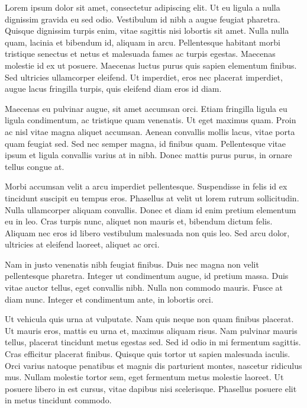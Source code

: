 \documentclass[../main.tex]{subfiles}
\begin{document}
\label{capitolo6}
\thispagestyle{empty}
Lorem ipsum dolor sit amet, consectetur adipiscing elit. Ut eu ligula a nulla dignissim gravida eu sed odio. Vestibulum id nibh a augue feugiat pharetra. Quisque dignissim turpis enim, vitae sagittis nisi lobortis sit amet. Nulla nulla quam, lacinia et bibendum id, aliquam in arcu. Pellentesque habitant morbi tristique senectus et netus et malesuada fames ac turpis egestas. Maecenas molestie id ex ut posuere. Maecenas luctus purus quis sapien elementum finibus. Sed ultricies ullamcorper eleifend. Ut imperdiet, eros nec placerat imperdiet, augue lacus fringilla turpis, quis eleifend diam eros id diam.

Maecenas eu pulvinar augue, sit amet accumsan orci. Etiam fringilla ligula eu ligula condimentum, ac tristique quam venenatis. Ut eget maximus quam. Proin ac nisl vitae magna aliquet accumsan. Aenean convallis mollis lacus, vitae porta quam feugiat sed. Sed nec semper magna, id finibus quam. Pellentesque vitae ipsum et ligula convallis varius at in nibh. Donec mattis purus purus, in ornare tellus congue at.

Morbi accumsan velit a arcu imperdiet pellentesque. Suspendisse in felis id ex tincidunt suscipit eu tempus eros. Phasellus at velit ut lorem rutrum sollicitudin. Nulla ullamcorper aliquam convallis. Donec et diam id enim pretium elementum eu in leo. Cras turpis nunc, aliquet non mauris et, bibendum dictum felis. Aliquam nec eros id libero vestibulum malesuada non quis leo. Sed arcu dolor, ultricies at eleifend laoreet, aliquet ac orci.

Nam in justo venenatis nibh feugiat finibus. Duis nec magna non velit pellentesque pharetra. Integer ut condimentum augue, id pretium massa. Duis vitae auctor tellus, eget convallis nibh. Nulla non commodo mauris. Fusce at diam nunc. Integer et condimentum ante, in lobortis orci.

Ut vehicula quis urna at vulputate. Nam quis neque non quam finibus placerat. Ut mauris eros, mattis eu urna et, maximus aliquam risus. Nam pulvinar mauris tellus, placerat tincidunt metus egestas sed. Sed id odio in mi fermentum sagittis. Cras efficitur placerat finibus. Quisque quis tortor ut sapien malesuada iaculis. Orci varius natoque penatibus et magnis dis parturient montes, nascetur ridiculus mus. Nullam molestie tortor sem, eget fermentum metus molestie laoreet. Ut posuere libero in est cursus, vitae dapibus nisi scelerisque. Phasellus posuere elit in metus tincidunt commodo.
\end{document}
